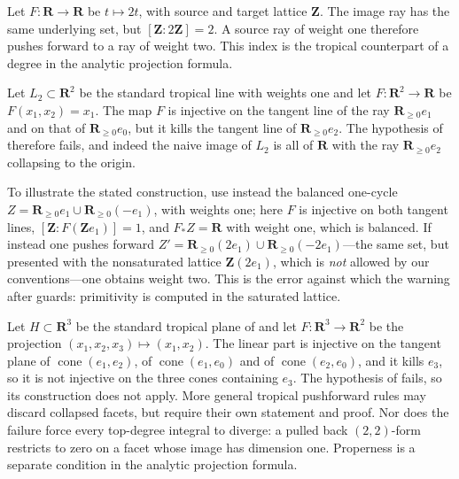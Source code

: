 \begin{example}
\label{ex:ch10-degree-two}
Let $F:\mathbf R\to\mathbf R$ be $t\mapsto2t$, with source and target lattice
$\mathbf Z$.  The image ray has the same underlying set, but
$[\mathbf Z:2\mathbf Z]=2$.  A source ray of weight one therefore pushes
forward to a ray of weight two.  This index is the tropical counterpart of a
degree in the analytic projection formula.
\end{example}

\begin{example}
\label{ex:ch10-project-line}
Let $L_2\subset\mathbf R^2$ be the standard tropical line with weights one
and let $F:\mathbf R^2\to\mathbf R$ be $F(x_1,x_2)=x_1$.  The map $F$ is
injective on the tangent line of the ray $\mathbf R_{\geq0}e_1$ and on that
of $\mathbf R_{\geq0}e_0$, but it kills the tangent line of
$\mathbf R_{\geq0}e_2$.  The hypothesis of
 therefore fails, and indeed the
naive image of $L_2$ is all of $\mathbf R$ with the ray
$\mathbf R_{\geq0}e_2$ collapsing to the origin.

To illustrate the stated construction, use instead the balanced one-cycle
$Z=\mathbf R_{\geq0}e_1\cup\mathbf R_{\geq0}(-e_1)$, with weights one; here
$F$ is injective on both tangent lines, $[\mathbf Z:F(\mathbf Ze_1)]=1$, and
$F_*Z=\mathbf R$ with weight one, which is balanced.  If instead one pushes
forward $Z'=\mathbf R_{\geq0}(2e_1)\cup\mathbf R_{\geq0}(-2e_1)$---the same
set, but presented with the nonsaturated lattice $\mathbf Z(2e_1)$, which is
\emph{not} allowed by our conventions---one obtains weight two.  This is the
error against which the warning after 
guards: primitivity is computed in the saturated lattice.
\end{example}

\begin{example}
\label{ex:ch10-project-plane}
Let $H\subset\mathbf R^3$ be the standard tropical plane of
 and let $F:\mathbf R^3\to\mathbf R^2$ be the
projection $(x_1,x_2,x_3)\mapsto(x_1,x_2)$.  The linear part is injective on
the tangent plane of $\operatorname{cone}(e_1,e_2)$, of
$\operatorname{cone}(e_1,e_0)$ and of $\operatorname{cone}(e_2,e_0)$, and it
kills $e_3$, so it is not injective on the three cones containing $e_3$.  The
hypothesis of  fails, so its
construction does not apply. More general tropical pushforward rules may
discard collapsed facets, but require their own statement and proof.
Nor does the failure force every top-degree integral to diverge: a pulled
back $(2,2)$-form restricts to zero on a facet whose image has dimension one.
Properness is a separate condition in the analytic projection formula.
\end{example}

